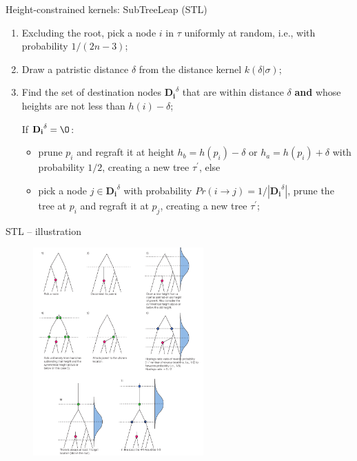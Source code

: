 \documentclass[newPxFont,numfooter,sectionpages]{beamer}
\begin{document}
\begin{frame}{Height-constrained kernels: SubTreeLeap (STL)}

\begin{enumerate}
     \item Excluding the root, pick a node $i$ in  $\tau$ uniformly at random, i.e., with probability $1/(2n-3)$;
     
     \item Draw a patristic distance $\delta$ from the distance kernel $k(\delta | \sigma)$;
     
     \item Find the set of destination nodes $\mathbf{D_i}^\delta $ that are within distance $\delta$ \textbf{and} whose heights are not less than $h(i) - \delta$;
     
      If $\mathbf{D_i}^\delta = \O$:
      \begin{itemize}
       \item prune $p_i$ and regraft it at height $h_{b} =  h(p_i) - \delta$ or $h_{a} =  h(p_i) + \delta$ with probability $1/2$, creating a new tree $\tau^\prime$, else
       \item pick a node $j \in \mathbf{D_i}^\delta $ with probability $Pr(i\to j) = 1/|\mathbf{D_i}^\delta |$, prune the tree at $p_i$ and regraft it at $p_j$, creating a new tree $\tau^\prime$;
      \end{itemize}
     
\end{enumerate}

\end{frame}


\begin{frame}{STL -- illustration}
\begin{figure}
	\includegraphics[width=\textwidth,height=8cm]{figures/STL_kernel.pdf} 
\end{figure}
\end{frame}
\end{document}
